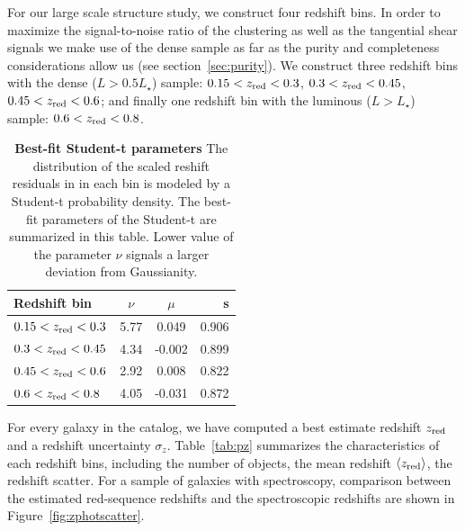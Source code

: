 \documentclass[fleqn,usenatbib,useAMS]{mnras}
\begin{document}
For our large scale structure study, we construct four redshift bins. 
In order to maximize the signal-to-noise ratio of the clustering as well as the tangential shear signals we make use of the dense sample as far as the purity and completeness considerations allow us (see section~\ref{sec:purity}). We construct three redshift bins with the dense ($L > 0.5 L_{\star}$) sample: $0.15<z_{\rm red}<0.3$, $0.3<z_{\rm red}<0.45$, $0.45<z_{\rm red}<0.6$; and finally one redshift bin with the luminous ($L > L_{\star}$) sample: $0.6<z_{\rm red}<0.8$.



\begin{table}
	\centering
	\caption{{\bf Best-fit Student-t parameters} The distribution of the scaled reshift residuals in in each bin is modeled by a Student-t probability density. The best-fit parameters of the Student-t are summarized in this table. Lower value of the parameter $\nu$ signals a larger deviation from Gaussianity.}
	\label{tab:student-t}
	\begin{tabularx}{0.7\columnwidth}{lccr} %
		\hline
		Redshift bin & $\nu$ & $\mu$ & s \\
		\hline
		$0.15 <z_{\rm red}<0.3$  & 5.77  & 0.049   &  0.906  \\
		$0.3  <z_{\rm red}<0.45$ & 4.34  & -0.002  &  0.899  \\
        $0.45 <z_{\rm red}<0.6$  & 2.92  &  0.008  &  0.822  \\
        $0.6  <z_{\rm red}<0.8$  & 4.05  & -0.031  &  0.872  \\
		\hline
	\end{tabularx}
\end{table}



For every galaxy in the catalog, we have computed a best estimate redshift $z_{\rm red}$ and a redshift uncertainty $\sigma_z$. Table~\ref{tab:pz} summarizes the 
characteristics of each redshift bins, including the number of objects, the mean redshift $\langle z_{\rm red} \rangle$, the redshift scatter. For a sample of galaxies with spectroscopy, comparison between the estimated red-sequence redshifts and the spectroscopic redshifts are shown in Figure~\ref{fig:zphotscatter}.
\end{document}
